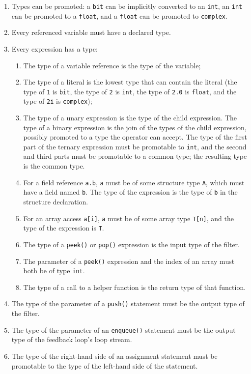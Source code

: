\documentclass[11pt]{article}
\begin{document}
\begin{enumerate}
\item Types can be promoted: a \lstinline|bit| can be implicitly
  converted to an \lstinline|int|, an \lstinline|int| can be promoted
  to a \lstinline|float|, and a \lstinline|float| can be promoted to
  \lstinline|complex|.
\item Every referenced variable must have a declared type.
\item Every expression has a type:
\begin{enumerate}
\item The type of a variable reference is the type of the variable;
\item The type of a literal is the lowest type that can contain the
  literal (the type of \lstinline|1| is \lstinline|bit|, the type of
  \lstinline|2| is \lstinline|int|, the type of \lstinline|2.0| is
  \lstinline|float|, and the type of \lstinline|2i| is
  \lstinline|complex|);
\item The type of a unary expression is the type of the child
  expression.  The type of a binary expression is the join of the
  types of the child expression, possibly promoted to a type the
  operator can accept.  The type of the first part of the ternary
  expression must be promotable to \lstinline|int|, and the second and
  third parts must be promotable to a common type; the resulting type
  is the common type.
\item For a field reference \lstinline|a.b|, \lstinline|a| must be of
  some structure type \lstinline|A|, which must have a field named
  \lstinline|b|.  The type of the expression is the type of
  \lstinline|b| in the structure declaration.
\item For an array access \lstinline|a[i]|, \lstinline|a| must be of
  some array type \lstinline|T[n]|, and the type of the expression is
  \lstinline|T|.
\item The type of a \lstinline|peek()| or \lstinline|pop()| expression
  is the input type of the filter.
\item The parameter of a \lstinline|peek()| expression and the index
  of an array must both be of type \lstinline|int|.
\item The type of a call to a helper function is the return type of
  that function.
\end{enumerate}
\item The type of the parameter of a \lstinline|push()| statement must
  be the output type of the filter.
\item The type of the parameter of an \lstinline|enqueue()| statement
  must be the output type of the feedback loop's loop stream.
\item The type of the right-hand side of an assignment statement must
  be promotable to the type of the left-hand side of the statement.
\end{enumerate}
\end{document}

